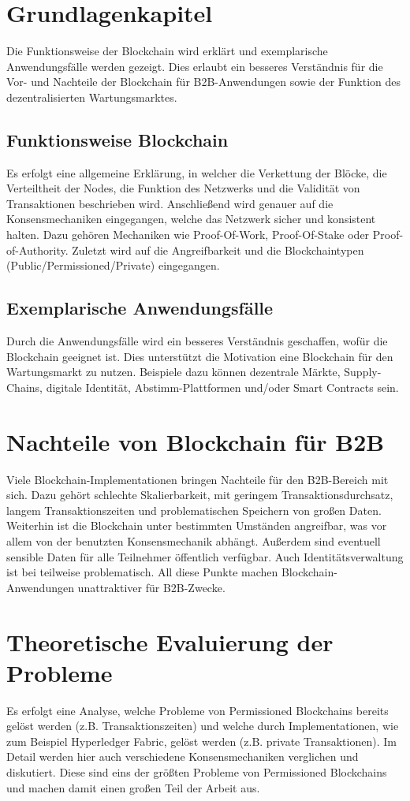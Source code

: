 \documentclass{llncs}
\begin{document}
\section{Grundlagenkapitel}
Die Funktionsweise der Blockchain wird erklärt und exemplarische Anwendungsfälle werden gezeigt. Dies erlaubt ein besseres Verständnis für die Vor- und Nachteile der Blockchain für B2B-Anwendungen sowie der Funktion des dezentralisierten Wartungsmarktes.

\subsection{Funktionsweise Blockchain}
Es erfolgt eine allgemeine Erklärung, in welcher die Verkettung der Blöcke, die Verteiltheit der Nodes, die Funktion des Netzwerks und die Validität von Transaktionen beschrieben wird. Anschließend wird genauer auf die Konsensmechaniken eingegangen, welche das Netzwerk sicher und konsistent halten. Dazu gehören Mechaniken wie Proof-Of-Work, Proof-Of-Stake oder Proof-of-Authority. Zuletzt wird auf die Angreifbarkeit und die Blockchaintypen (Public/Permissioned/Private) eingegangen.

\subsection{Exemplarische Anwendungsfälle}
Durch die Anwendungsfälle wird ein besseres Verständnis geschaffen, wofür die Blockchain geeignet ist. Dies unterstützt die Motivation eine Blockchain für den Wartungsmarkt zu nutzen. Beispiele dazu können dezentrale Märkte, Supply-Chains, digitale Identität, Abstimm-Plattformen und/oder Smart Contracts sein.

\section{Nachteile von Blockchain für B2B}
Viele Blockchain-Implementationen bringen Nachteile für den B2B-Bereich mit sich. Dazu gehört schlechte Skalierbarkeit, mit geringem Transaktionsdurchsatz, langem Transaktionszeiten und problematischen Speichern von großen Daten. Weiterhin ist die Blockchain unter bestimmten Umständen angreifbar, was vor allem von der benutzten Konsensmechanik abhängt. Außerdem sind eventuell sensible Daten für alle Teilnehmer öffentlich verfügbar. Auch Identitätsverwaltung ist bei teilweise problematisch. All diese Punkte machen Blockchain-Anwendungen unattraktiver für B2B-Zwecke.

\section{Theoretische Evaluierung der Probleme}
Es erfolgt eine Analyse, welche Probleme von Permissioned Blockchains bereits gelöst werden (z.B. Transaktionszeiten) und welche durch Implementationen, wie zum Beispiel Hyperledger Fabric, gelöst werden (z.B. private Transaktionen). Im Detail werden hier auch verschiedene Konsensmechaniken verglichen und diskutiert. Diese sind eins der größten Probleme von Permissioned Blockchains und machen damit einen großen Teil der Arbeit aus.
\end{document}
